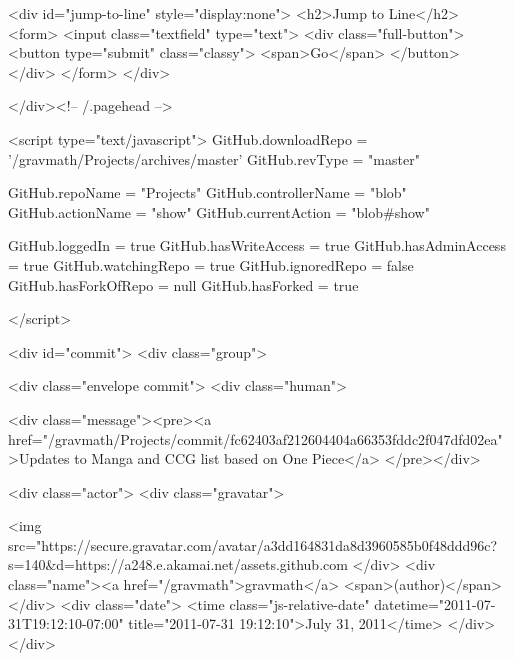     <div id="jump-to-line" style="display:none">
      <h2>Jump to Line</h2>
      <form>
        <input class="textfield" type="text">
        <div class="full-button">
          <button type="submit" class="classy">
            <span>Go</span>
          </button>
        </div>
      </form>
    </div>


        

      </div><!-- /.pagehead -->

      

  







<script type="text/javascript">
  GitHub.downloadRepo = '/gravmath/Projects/archives/master'
  GitHub.revType = "master"

  GitHub.repoName = "Projects"
  GitHub.controllerName = "blob"
  GitHub.actionName     = "show"
  GitHub.currentAction  = "blob#show"

  
    GitHub.loggedIn = true
    GitHub.hasWriteAccess = true
    GitHub.hasAdminAccess = true
    GitHub.watchingRepo = true
    GitHub.ignoredRepo = false
    GitHub.hasForkOfRepo = null
    GitHub.hasForked = true
  

  
</script>







  <div id="commit">
    <div class="group">
        
  <div class="envelope commit">
    <div class="human">
      
        <div class="message"><pre><a href="/gravmath/Projects/commit/fc62403af212604404a66353fddc2f047dfd02ea">Updates to Manga and CCG list based on One Piece</a> </pre></div>
      

      <div class="actor">
        <div class="gravatar">
          
          <img src="https://secure.gravatar.com/avatar/a3dd164831da8d3960585b0f48ddd96c?s=140&d=https://a248.e.akamai.net/assets.github.com%
        </div>
        <div class="name"><a href="/gravmath">gravmath</a> <span>(author)</span></div>
        <div class="date">
          <time class="js-relative-date" datetime="2011-07-31T19:12:10-07:00" title="2011-07-31 19:12:10">July 31, 2011</time>
        </div>
      </div>

      

